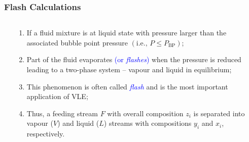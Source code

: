 \documentclass[10pt,compress]{beamer}
\begin{document}
\begin{frame}
  \frametitle{Flash Calculations}
  \begin{columns}
     \begin{column}[c]{0.5\linewidth}
     \end{column}
     \begin{column}[l]{0.5\linewidth}
        \begin{enumerate}
           \item<1-> If a fluid mixture is at liquid state with pressure larger than the associated bubble point pressure $\left(\text{i.e., }P \leq P_{\text{BP}}\right)$;
           \item<2-> Part of the fluid evaporates \textcolor{blue}{(or {\it flashes})} when the pressure is reduced leading to a two-phase system -- vapour and liquid in equilibrium;
            \item<3-> This phenomenon is often called \textcolor{blue}{\it flash} and is the most important application of VLE;
            \item<4-> Thus, a feeding stream $F$ with overall composition $z_{i}$ is separated into vapour ($V$) and liquid ($L$) streams with compositions $y_{i}$ and $x_{i}$, respectively. 
        \end{enumerate}
     \end{column}
   \end{columns}
\end{frame}
\end{document}
